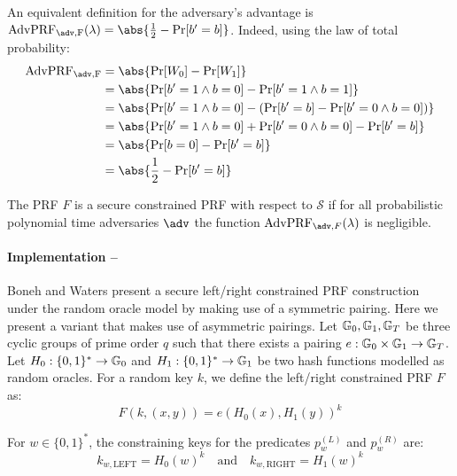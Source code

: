 		\noindent An equivalent definition for the adversary's advantage is $\mathrm{AdvPRF_{\adv, F}}(\lambda) = \abs{\frac{1}{2} - \Pr[b' = b]}$. Indeed, using the law of total probability:
		\begin{align}
				\mathrm{AdvPRF_{\adv, F}} &= \abs{\mathrm{Pr}[W_0] - \mathrm{Pr}[W_1]} \\
				&= \abs{\Pr[b' = 1 \land b=0] - \Pr[b' = 1 \land b=1]} \\
				&= \abs{\Pr[b' = 1 \land b=0] - \left(\Pr[b' = b] - \Pr[b' = 0 \land b=0] \right)} \\
				&= \abs{\Pr[b' = 1 \land b=0] + \Pr[b' = 0 \land b=0] - \Pr[b' = b]}\\
				&= \abs{\Pr[b=0]- \Pr[b' = b]} \\
				&= \abs{\frac{1}{2} - \Pr[b' = b]}
			\end{align}
		
		\begin{definition}
		\label{def:lrPRFsec}
			The PRF $F$ is a secure constrained PRF with respect to $\mathcal{S}$ if for all probabilistic
polynomial time adversaries $\adv$ the function $\mathrm{AdvPRF}_{\adv,F}(\lambda)$ is negligible.
		\end{definition}




\paragraph{Implementation --} \label{leftright} Boneh and Waters \cite{LRPRF} present a secure left/right constrained PRF construction under the random oracle model by making use of a symmetric pairing. Here we present a variant that makes use of asymmetric pairings. Let $\mathbb{G}_0, \mathbb{G}_1, \mathbb{G}_T$ be three cyclic groups of prime order $q$ such that there exists a pairing $e : \mathbb{G}_0 \times \mathbb{G}_1 \rightarrow \mathbb{G}_T$. Let $H_0: \{0,1\}^* \rightarrow \mathbb{G}_0$ and $H_1: \{0,1\}^* \rightarrow \mathbb{G}_1$ be two hash functions modelled as random oracles. For a random key $k$, we define the left/right constrained PRF $F$ as:
\begin{equation}
	\label{eq:LRPRF}
	F(k, (x,y)) = e(H_0(x), H_1(y))^k
\end{equation}

For $w \in \{0,1\}^*$, the constraining keys for the predicates $p_w^{(L)}$ and  $p_w^{(R)}$ are:
\begin{equation}
\label{eq:constrkeys}
	k_{w,\mathrm{LEFT}} = H_0(w)^k \quad \mathrm{and} \quad k_{w,\mathrm{RIGHT}} = H_1(w)^k
\end{equation}

